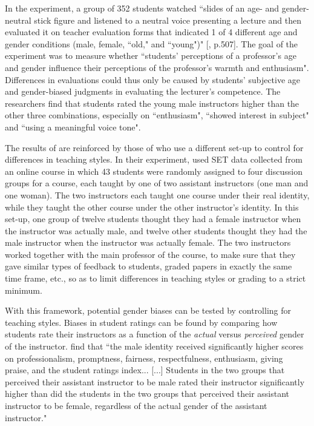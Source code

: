\documentclass[12pt]{article}
\begin{document}
In the \citet{Arbuckle2003} experiment, a group of 352 students watched \textquotedblleft slides of an age- and gender-neutral stick figure and listened to a neutral voice presenting a lecture and then evaluated it on teacher evaluation forms that indicated 1 of 4 different age and gender conditions (male, female, \textquotedblleft old," and \textquotedblleft young")" [\citealp{Arbuckle2003}, p.507]. 
The goal of the experiment was to measure whether \textquotedblleft students' perceptions of a professor's age and gender influence their perceptions of the professor's warmth and enthusiasm". Differences in evaluations could thus only be caused by students' subjective age and gender-biased judgments in evaluating the lecturer's competence. The researchers find that students rated the young male instructors higher than the other three combinations, especially on \textquotedblleft enthusiasm", \textquotedblleft showed interest in subject"  and \textquotedblleft using a meaningful voice tone". 

The results of \citet{Arbuckle2003} are reinforced by those of \citet{MacNell2014} who use a different set-up to control for differences in teaching styles. In their experiment, \citet{MacNell2014} used SET data collected from an online course in which 43 students were randomly assigned to four discussion groups for a course, each taught by one of two assistant instructors (one man and one woman). The two instructors each taught one course under their real identity, while they taught the other course under the other instructor's identity. In this set-up, one group of twelve students thought they had a female instructor when the instructor was actually male, and twelve other students thought they had the male instructor when the instructor was actually female. The two instructors worked together with the main professor of the course, to make sure that they gave similar types of feedback to students, graded papers in exactly the same time frame, etc., so as to limit differences in teaching styles or grading to a strict minimum. 

With this framework, potential gender biases can be tested by controlling for teaching styles. Biases in student ratings can be found by comparing how students rate their instructors as a function of the \textit{actual} versus \textit{perceived} gender of the instructor. \citet{MacNell2014} find that ``the male identity received significantly higher scores on professionalism, promptness, fairness, respectfulness, enthusiasm, giving praise, and the
student ratings index... [...] Students in the two groups that perceived their assistant
instructor to be male rated their instructor significantly higher than did the students in the
two groups that perceived their assistant instructor to be female, regardless of the actual gender
of the assistant instructor." 
\end{document}
